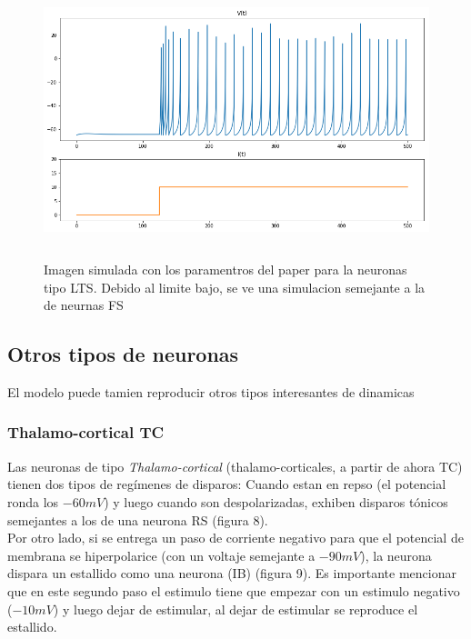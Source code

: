 \documentclass[12pt]{article}
\begin{document}
\begin{figure}[h!]
    \centering
        \includegraphics[height=8cm]{images/LTS.png}
    \caption[fontsize=2pt]{Imagen simulada con los paramentros del paper para la neuronas tipo LTS. Debido al limite bajo, se ve una simulacion semejante a la de neurnas FS}
\end{figure}
\newpage

\subsection{Otros tipos de neuronas}
El modelo puede tamien reproducir otros tipos interesantes de dinamicas

\subsubsection{Thalamo-cortical TC}
Las neuronas de tipo \textit{Thalamo-cortical} (thalamo-corticales, a partir de ahora TC) tienen dos tipos de regímenes de disparos:
Cuando estan en repso (el potencial ronda los $-60 mV$) y luego cuando son despolarizadas, exhiben disparos tónicos semejantes a los de una neurona RS (figura 8). \\
Por otro lado, si se entrega un paso de corriente negativo para que el potencial de membrana se hiperpolarice (con un voltaje semejante a $-90 mV$), la neurona dispara un estallido como una neurona (IB) (figura 9).
Es importante mencionar que en este segundo paso el estimulo tiene que empezar con un estimulo negativo ($-10mV$) y luego dejar de estimular, al dejar de estimular se reproduce el estallido.
\end{document}
